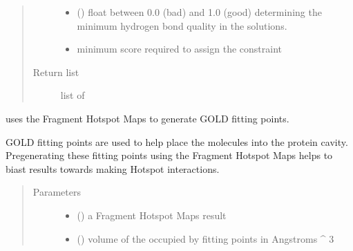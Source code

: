 \documentclass[letterpaper,10pt,english]{sphinxmanual}
\begin{document}
\begin{fulllineitems}
\begin{fulllineitems}
\begin{fulllineitems}
\begin{quote}
\begin{description}
\begin{itemize}
\item {} 
 () \textendash{} float between 0.0 (bad) and 1.0 (good) determining the minimum hydrogen bond quality in the solutions.

\item {} 
 \textendash{} minimum score required to assign the constraint

\end{itemize}

\item[{Return list}] \leavevmode
list of 

\end{description}\end{quote}

\end{fulllineitems}


\end{fulllineitems}


\begin{fulllineitems}
\label{\detokenize{hs_docking_api:hotspots.hs_docking.DockerSettings.generate_fitting_points}}
uses the Fragment Hotspot Maps to generate GOLD fitting points.

GOLD fitting points are used to help place the molecules into the protein cavity. Pre\sphinxhyphen{}generating these fitting
points using the Fragment Hotspot Maps helps to biast results towards making Hotspot interactions.
\begin{quote}\begin{description}
\item[{Parameters}] \leavevmode\begin{itemize}
\item {} 
 () \textendash{} a Fragment Hotspot Maps result

\item {} 
 () \textendash{} volume of the occupied by fitting points in Angstroms \textasciicircum{} 3


\end{itemize}
\end{description}
\end{quote}
\end{fulllineitems}
\end{fulllineitems}
\end{document}
